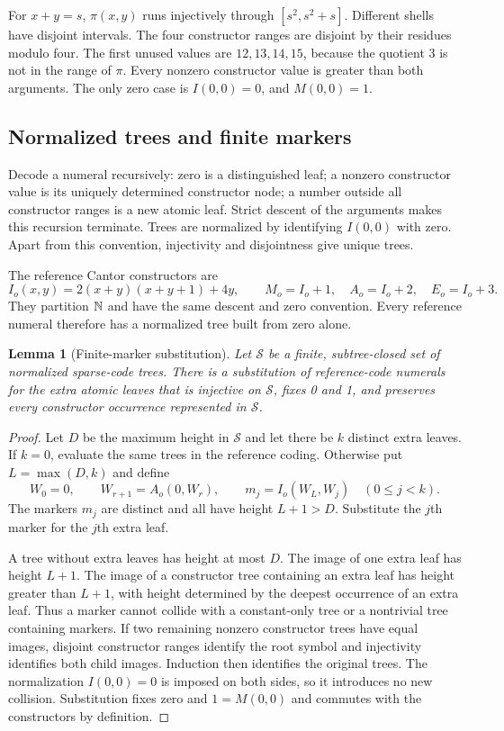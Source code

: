 \documentclass[11pt,letterpaper]{article}
\newtheorem{lemma}[theorem]{Lemma}
\theoremstyle{remark}\newtheorem{remark}[theorem]{Remark}
\begin{document}
For $x+y=s$, $\pi(x,y)$ runs injectively through
$[s^2,s^2+s]$. Different shells have disjoint intervals. The four
constructor ranges are disjoint by their residues modulo four. The first
unused values are $12,13,14,15$, because the quotient 3 is not in the range
of $\pi$. Every nonzero constructor value is greater than both arguments.
The only zero case is $I(0,0)=0$, and $M(0,0)=1$.

\subsection{Normalized trees and finite markers}

Decode a numeral recursively: zero is a distinguished leaf; a nonzero
constructor value is its uniquely determined constructor node; a number
outside all constructor ranges is a new atomic leaf. Strict descent of
the arguments makes this recursion terminate. Trees are normalized by
identifying $I(0,0)$ with zero. Apart from this convention, injectivity
and disjointness give unique trees.

The reference Cantor constructors are
\[
 I_o(x,y)=2(x+y)(x+y+1)+4y,\qquad
 M_o=I_o+1,\quad A_o=I_o+2,\quad E_o=I_o+3.
\]
They partition $\mathbb N$ and have the same descent and zero convention. Every
reference numeral therefore has a normalized tree built from zero alone.

\begin{lemma}[Finite-marker substitution]\label{lem:markers}
Let $\mathcal S$ be a finite, subtree-closed set of normalized sparse-code
trees. There is a substitution of reference-code numerals for the extra
atomic leaves that is injective on $\mathcal S$, fixes 0 and 1, and
preserves every constructor occurrence represented in $\mathcal S$.
\end{lemma}
\begin{proof}
Let $D$ be the maximum height in $\mathcal S$ and let there be $k$ distinct
extra leaves. If $k=0$, evaluate the same trees in the reference coding.
Otherwise put $L=\max(D,k)$ and define
\[
 W_0=0,\qquad W_{r+1}=A_o(0,W_r),\qquad
 m_j=I_o(W_L,W_j)\quad(0\le j<k).
\]
The markers $m_j$ are distinct and all have height $L+1>D$. Substitute
the $j$th marker for the $j$th extra leaf.

A tree without extra leaves has height at most $D$. The image of one
extra leaf has height $L+1$. The image of a constructor tree containing
an extra leaf has height greater than $L+1$, with height determined by
the deepest occurrence of an extra leaf. Thus a marker cannot collide
with a constant-only tree or a nontrivial tree containing markers.
If two remaining nonzero constructor trees have equal images, disjoint
constructor ranges identify the root symbol and injectivity identifies
both child images. Induction then identifies the original trees. The
normalization $I(0,0)=0$ is imposed on both sides, so it introduces no
new collision. Substitution fixes zero and $1=M(0,0)$ and commutes with
the constructors by definition.
\end{proof}
\end{document}
